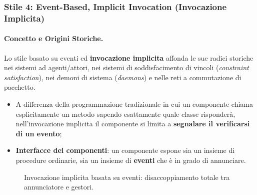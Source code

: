 \documentclass[12pt]{extarticle}
\begin{document}
\subsubsection{Stile 4: Event-Based, Implicit Invocation (Invocazione Implicita)}

\paragraph{Concetto e Origini Storiche.}
Lo stile basato su eventi ed \textbf{invocazione implicita} affonda le sue radici storiche nei sistemi ad agenti/attori, nei sistemi di soddisfacimento di vincoli (\textit{constraint satisfaction}), nei demoni di sistema (\textit{daemons}) e nelle reti a commutazione di pacchetto.
\begin{itemize}
    \item A differenza della programmazione tradizionale in cui un componente chiama esplicitamente un metodo sapendo esattamente quale classe risponderà, nell'invocazione implicita il componente si limita a \textbf{segnalare il verificarsi di un evento};
    \item \textbf{Interfacce dei componenti}: un componente espone sia un insieme di procedure ordinarie, sia un insieme di \textbf{eventi} che è in grado di annunciare.
\end{itemize}

\begin{figure}[htbp]
\centering
{}
\caption{Invocazione implicita basata su eventi: disaccoppiamento totale tra annunciatore e gestori.}
\label{fig:implicit_invocation_diagram}
\end{figure}
\end{document}
